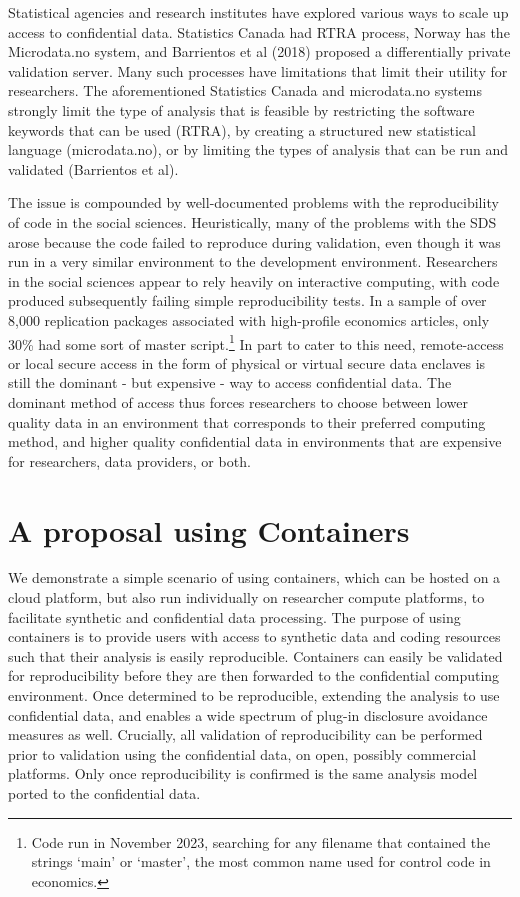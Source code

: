 \documentclass[]{hdsr}
\begin{document}
Statistical agencies and research institutes have explored various ways to scale up access to confidential data. Statistics Canada had RTRA process, Norway has the Microdata.no system, and Barrientos et al (2018) proposed a differentially private validation server. Many such processes have limitations that limit their utility for researchers. The aforementioned Statistics Canada and microdata.no systems strongly limit the type of analysis that is feasible by restricting the software keywords that can be used (RTRA), by creating a structured new statistical language (microdata.no), or by limiting the types of analysis that can be run and validated (Barrientos et al).

The issue is compounded by well-documented problems with the reproducibility of code in the social sciences. Heuristically, many of the problems with the SDS arose because the code failed to reproduce during validation, even though it was  run in a very similar environment to the development environment. Researchers in the social sciences appear to rely heavily on interactive computing, with code produced subsequently failing simple reproducibility tests. In a sample of over 8,000 replication packages associated with high-profile economics articles, only 30\% had some sort of master script.\footnote{Code run in November 2023, searching for any filename that contained the strings `main' or `master', the most common name used for control code in economics.} In part to cater to this need, remote-access or local secure access in the form of physical or virtual secure data enclaves is still the dominant - but expensive - way to access confidential data. The dominant method of access thus forces researchers to choose between lower quality data in an environment that corresponds to their preferred computing method, and higher quality confidential data in environments that are expensive for researchers, data providers, or both.


\section{A proposal using Containers}
\label{sec:proposal}
We demonstrate a simple scenario of using containers, which can be hosted on a cloud platform, but also run individually on researcher compute platforms, to facilitate synthetic and confidential data processing. The purpose of using containers is to provide users with access to synthetic data and coding resources such that their analysis is easily reproducible. Containers can easily be validated for reproducibility before they are then forwarded to the confidential computing environment. Once determined to be reproducible, extending the analysis to use confidential data, and enables a wide spectrum of plug-in disclosure avoidance measures as well. Crucially, all validation of reproducibility can be performed prior to validation using the confidential data, on open, possibly commercial platforms. Only once reproducibility is confirmed is the same analysis model ported to the confidential data. 
\end{document}
